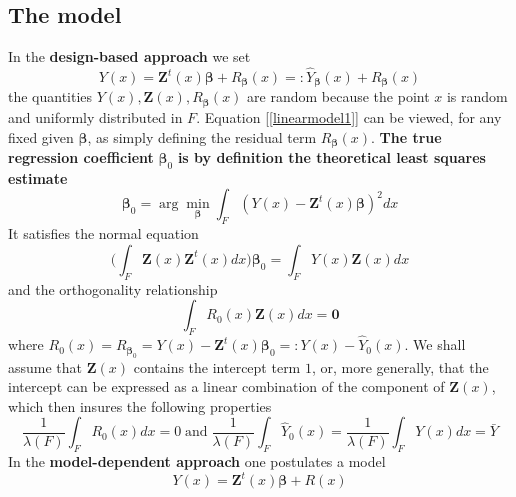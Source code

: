\documentclass[a4paper,12pt,leqno, titlepage]{article}
\begin{document}
 \subsection{The model}
 In the \textbf{design-based approach} we set
 \begin{equation}\label{linearmodel1}
 Y(x)=\pmb{Z}^t(x)\pmb{\beta}+ R_{\pmb{\beta}}(x)=:\hat{Y}_{\pmb{\beta}}(x)+R_{\pmb{\beta}}(x)
 \end{equation}
 the quantities $Y(x), \pmb{Z}(x), R_{\pmb{\beta}}(x)$ are random because the point $x$ is random and uniformly distributed in $F$. Equation [\ref{linearmodel1}] can be viewed, for any fixed given $\pmb{\beta}$, as simply defining the residual term $R_{\pmb{\beta}}(x)$. \textbf{The true regression coefficient} $\pmb{\beta}_0$ \textbf{is by definition the theoretical least squares estimate}
 \begin{equation}\label{lstheoretical}
 \pmb{\beta}_0=\arg \min_{\pmb{\beta}}\int_F (Y(x)-\pmb{Z}^t(x)\pmb{\beta})^2dx
 \end{equation}
 It satisfies the normal equation
 \begin{equation}\label{normaleq1}
 \Big(\int_F\pmb{Z}(x)\pmb{Z}^t(x)dx\Big)\pmb{\beta}_0=\int_F Y(x)\pmb{Z}(x)dx
 \end{equation}
 and the orthogonality relationship
 \begin{equation}\label{linearmodel2}
 \int_F R_0(x)\pmb{Z}(x)dx=\pmb{0}
 \end{equation}
 where $R_0(x)=R_{\pmb{\beta}_0}=Y(x)-\pmb{Z}^t(x)\pmb{\beta}_0=:Y(x)-\hat{Y}_0(x)$.
  We shall assume that $\pmb{Z}(x)$ contains the intercept term $1$, or, more generally, that the intercept can be expressed as a linear combination of the component of $\pmb{Z}(x)$, which then insures the following properties
  \begin{equation}\label{truerespred}
  \frac{1}{\lambda(F)}\int_F R_0(x)dx=0\; \text{and}\;\frac{1}{\lambda(F)}\int_{F}\hat{Y}_0(x)=\frac{1}{\lambda(F)}\int_{F}Y(x)dx=\bar{Y}
  \end{equation}
In the \textbf{model-dependent approach} one postulates a model
 \begin{equation}\label{linearmodel1mod_dep}
 Y(x)=\pmb{Z}^t(x)\pmb{\beta}+ R(x)
 \end{equation}
 \noindent
\end{document}
